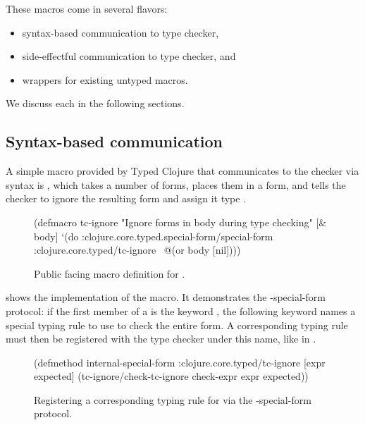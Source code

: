 These macros come in several flavors:

\begin{itemize}
  \item syntax-based communication to type checker,
  \item side-effectful communication to type checker, and
  \item wrappers for existing untyped macros.
\end{itemize}

We discuss each in the following sections.

\subsection{Syntax-based communication}

A simple macro provided by Typed Clojure that communicates to the checker
via syntax is , which takes a number of forms, places
them in a  form, and tells the checker to ignore the resulting
form and assign it type .

\begin{figure*}
\begin{cljlisting}
(defmacro tc-ignore 
  "Ignore forms in body during type checking"
  [& body]
  `(do :clojure.core.typed.special-form/special-form
       :clojure.core.typed/tc-ignore
       ~@(or body [nil])))
\end{cljlisting}
  \caption{Public facing macro definition for .}
  \label{fig:analyzer:tc-ignore}
\end{figure*}

 shows the implementation of the  macro.
It demonstrates the -special-form protocol:
if the first member of a  is the keyword
,
the following keyword names a special typing rule to use
to check the entire form.
A corresponding typing rule must then be registered with the type checker under this name,
like in .

\begin{figure*}
\begin{cljlisting}
(defmethod internal-special-form :clojure.core.typed/tc-ignore
  [expr expected]
  (tc-ignore/check-tc-ignore check-expr expr expected))
\end{cljlisting}
  \caption{Registering a corresponding typing rule for  via the -special-form protocol.}
  \label{fig:analyzer:tc-ignore-do-op}
\end{figure*}


